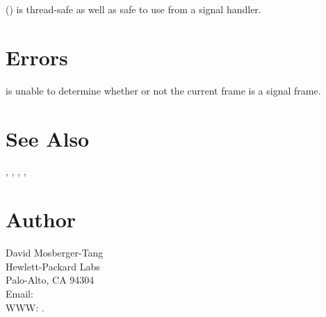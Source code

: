 \documentclass{article}
\begin{document}
() is thread-safe as well as safe to use
from a signal handler.

\section{Errors}

\begin{Description}
\item[\Const{UNW\_ENOINFO}]  is unable to determine
  whether or not the current frame is a signal frame.
\end{Description}

\section{See Also}

,
,
,
,

\section{Author}

\noindent
David Mosberger-Tang\\
Hewlett-Packard Labs\\
Palo-Alto, CA 94304\\
Email: \\
WWW: .
\LatexManEnd
\end{document}
